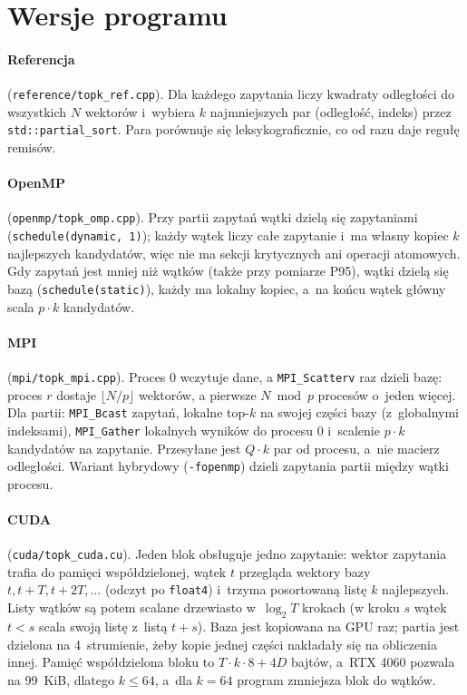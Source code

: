 \documentclass[11pt,a4paper]{article}
\begin{document}
\begin{table}[H]
\centering\small
\caption{Zgodność rankingów z~referencją, przypadek główny (1000 zapytań, $k=10$).}\label{tab:ranking}

\end{table}

\section{Wersje programu}
\paragraph{Referencja} (\texttt{reference/topk\_ref.cpp}). Dla każdego zapytania liczy kwadraty odległości do wszystkich $N$ wektorów i~wybiera $k$ najmniejszych par (odległość, indeks) przez \texttt{std::partial\_sort}. Para porównuje się leksykograficznie, co od razu daje regułę remisów.

\paragraph{OpenMP} (\texttt{openmp/topk\_omp.cpp}). Przy partii zapytań wątki dzielą się zapytaniami (\texttt{schedule(dynamic, 1)}); każdy wątek liczy całe zapytanie i~ma własny kopiec $k$ najlepszych kandydatów, więc nie ma sekcji krytycznych ani operacji atomowych. Gdy zapytań jest mniej niż wątków (także przy pomiarze P95), wątki dzielą się bazą (\texttt{schedule(static)}), każdy ma lokalny kopiec, a~na końcu wątek główny scala $p\cdot k$ kandydatów.

\paragraph{MPI} (\texttt{mpi/topk\_mpi.cpp}). Proces 0 wczytuje dane, a \texttt{MPI\_Scatterv} raz dzieli bazę: proces $r$ dostaje $\lfloor N/p\rfloor$ wektorów, a pierwsze $N \bmod p$ procesów o~jeden więcej. Dla partii: \texttt{MPI\_Bcast} zapytań, lokalne top-$k$ na swojej części bazy (z~globalnymi indeksami), \texttt{MPI\_Gather} lokalnych wyników do procesu 0 i~scalenie $p\cdot k$ kandydatów na zapytanie. Przesyłane jest $Q\cdot k$ par od procesu, a~nie macierz odległości. Wariant hybrydowy (\texttt{-fopenmp}) dzieli zapytania partii między wątki procesu.

\paragraph{CUDA} (\texttt{cuda/topk\_cuda.cu}). Jeden blok obsługuje jedno zapytanie: wektor zapytania trafia do pamięci współdzielonej, wątek $t$ przegląda wektory bazy $t, t+T, t+2T,\dots$ (odczyt po \texttt{float4}) i~trzyma posortowaną listę $k$ najlepszych. Listy wątków są potem scalane drzewiasto w~$\log_2 T$ krokach (w kroku $s$ wątek $t<s$ scala swoją listę z~listą $t+s$). Baza jest kopiowana na GPU raz; partia jest dzielona na 4~strumienie, żeby kopie jednej części nakładały się na obliczenia innej. Pamięć współdzielona bloku to $T\cdot k\cdot 8 + 4D$ bajtów, a~RTX 4060 pozwala na 99~KiB, dlatego $k\le 64$, a~dla $k=64$ program zmniejsza blok do \cudaBlokKmax{} wątków.
\end{document}
